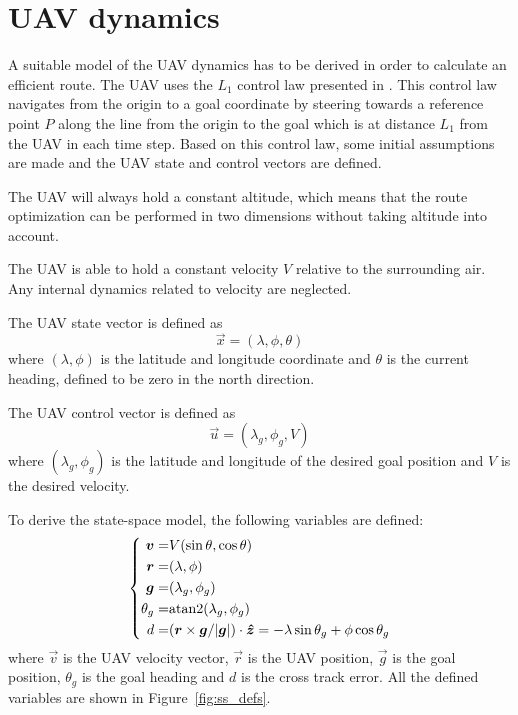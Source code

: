 \section{UAV dynamics}
A suitable model of the UAV dynamics has to be derived in order to calculate an efficient route. The UAV uses the $L_1$ control law presented in \cite{l1_controller}. This control law navigates from the origin to a goal coordinate by steering towards a reference point $P$ along the line from the origin to the goal which is at distance $L_1$ from the UAV in each time step. Based on this control law, some initial assumptions are made and the UAV state and control vectors are defined.

\begin{assumption}
The UAV will always hold a constant altitude, which means that the route optimization can be performed in two dimensions without taking altitude into account.
\end{assumption}

\begin{assumption}
The UAV is able to hold a constant velocity $V$ relative to the surrounding air. Any internal dynamics related to velocity are neglected.
\end{assumption}

\begin{definition}
The UAV state vector is defined as
\begin{equation}\label{eq:ss_first}
\vec{x}=(\lambda,\phi,\theta)    
\end{equation}
where $(\lambda,\phi)$ is the latitude and longitude coordinate and $\theta$ is the current heading, defined to be zero in the north direction.
\end{definition}

\begin{definition}
The UAV control vector is defined as
\begin{equation}
    \vec{u}=(\lambda_g,\phi_g,V)
\end{equation}
where $(\lambda_g,\phi_g)$ is the latitude and longitude of the desired goal position and $V$ is the desired velocity.
\end{definition}

To derive the state-space model, the following variables are defined:
\begin{equation}\label{eq:ss_variabels}
    \left\{
    \begin{aligned}
        \boldsymbol{v}=&V(\sin\theta, \cos\theta)\\
        \boldsymbol{r}=&(\lambda, \phi)\\
        \boldsymbol{g}=&(\lambda_g, \phi_g)\\
        \theta_g=&\mathrm{atan2}(\lambda_g, \phi_g)\\
        d=&(\boldsymbol{r}\times\boldsymbol{g}/|\boldsymbol{g}|)\cdot\boldsymbol{\hat{z}}=-\lambda\sin\theta_g + \phi\cos\theta_g 
    \end{aligned}
    \right.
\end{equation}
where $\vec{v}$ is the UAV velocity vector, $\vec{r}$ is the UAV position, $\vec{g}$ is the goal position, $\theta_g$ is the goal heading and $d$ is the cross track error. All the defined variables are shown in Figure~\ref{fig:ss_defs}.

